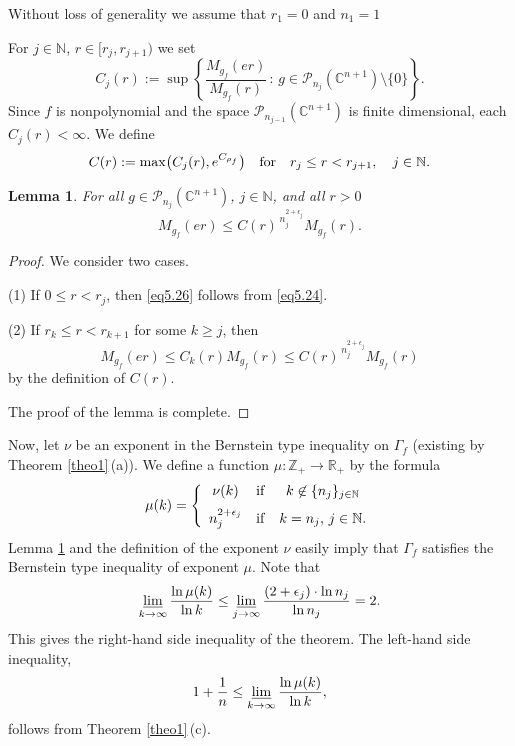 \documentclass[11pt, oneside]{amsart}
\newtheorem{Lm}[Th]{Lemma}
\begin{document}
Without loss of generality we assume that $r_1=0$ and $n_1=1$

For $j\in\mathbb N$, $r\in [r_j, r_{j+1})$ we set
\[
C_j(r):=\sup\left\{\frac{M_{g_f}(er)}{M_{g_f}(r)}\, :\, g\in \mathcal P_{n_{j}}(\mathbb C^{n+1})\setminus\{0\}\right\}.
\]
Since $f$ is nonpolynomial and the space $\mathcal P_{n_{j-1}}(\mathbb C^{n+1})$ is finite dimensional, each $C_j(r)<\infty$.  
We define 
\begin{equation}\label{eq5.25}
C(r):=\max\bigl(C_j(r),e^{C_{\rho_f}}\bigr)\quad {\rm for}\quad r_j\le r< r_{j+1},\quad j\in\mathbb N.
\end{equation}
\begin{Lm}\label{lem5.1}
For all $g\in\mathcal P_{n_j}(\mathbb C^{n+1})$, $j\in\mathbb N$, and all $r>0$ 
\begin{equation}\label{eq5.26}
M_{g_f}(er)\le C(r)^{\, n_j^{2+\epsilon_j}}M_{g_f}(r).
\end{equation}
\end{Lm}
\begin{proof}
We consider two cases.

(1) If $0\le r< r_{j}$, then \eqref{eq5.26} follows from \eqref{eq5.24}.\smallskip

(2) If $r_{k}\le r< r_{k+1}$ for some $k\ge j$, then 
\[
M_{g_f}(er)\le C_k(r) M_{g_f}(r)\le C(r)^{\, n_j^{2+\epsilon_j}} M_{g_f}(r)
\]
by the definition of $C(r)$.

The proof of the lemma is complete.
\end{proof}

Now, let $\nu$ be an exponent in the Bernstein type inequality on $\Gamma_f$ (existing by Theorem \ref{theo1}\,(a)). We define a function $\mu:\mathbb Z_+\rightarrow\mathbb R_+$ by the formula
\[
\mu(k)=\left\{
\begin{array}{ccc}
\nu(k)&{\rm if}&k\not\in\{n_j\}_{j\in\mathbb N}\medskip\\
n_j^{2+\epsilon_j}&{\rm if}&k=n_j,\, j\in\mathbb N.
\end{array}
\right.
\]
Lemma \ref{lem5.1} and the definition of the exponent $\nu$ easily imply that $\Gamma_f$ satisfies the Bernstein type inequality of exponent $\mu$. Note that
\[
\varliminf_{k\rightarrow\infty}\frac{\ln\mu(k)}{\ln k}\le \varliminf_{j\rightarrow\infty}\frac{(2+\epsilon_j)\cdot\ln n_j}{\ln n_j}=2.
\]
This gives the right-hand side inequality of the theorem.
The left-hand side inequality,
\[
1+\frac 1n \le \varliminf_{k\rightarrow\infty}\frac{\ln\mu(k)}{\ln k},
\]
follows from Theorem \ref{theo1}\,(c).
\end{document}
